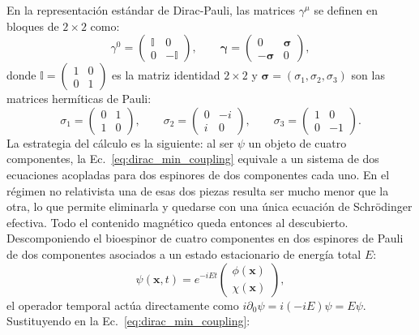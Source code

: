 \documentclass[10pt,a4paper]{article}
\begin{document}
En la representación estándar de Dirac-Pauli, las matrices $\gamma^\mu$ se definen en bloques de $2 \times 2$ como:
\begin{equation}
\gamma^0 = \begin{pmatrix} \mathbb{I} & 0 \\ 0 & -\mathbb{I} \end{pmatrix}, \qquad \boldsymbol{\gamma} = \begin{pmatrix} 0 & \boldsymbol{\sigma} \\ -\boldsymbol{\sigma} & 0 \end{pmatrix},
\end{equation}
donde $\mathbb{I} = \begin{pmatrix} 1 & 0 \\ 0 & 1 \end{pmatrix}$ es la matriz identidad $2\times 2$ y $\boldsymbol{\sigma} = (\sigma_1, \sigma_2, \sigma_3)$ son las matrices hermíticas de Pauli:
\begin{equation}
\sigma_1 = \begin{pmatrix} 0 & 1 \\ 1 & 0 \end{pmatrix}, \qquad \sigma_2 = \begin{pmatrix} 0 & -i \\ i & 0 \end{pmatrix}, \qquad \sigma_3 = \begin{pmatrix} 1 & 0 \\ 0 & -1 \end{pmatrix}.
\end{equation}
La estrategia del cálculo es la siguiente: al ser $\psi$ un objeto de cuatro componentes, la Ec.~\eqref{eq:dirac_min_coupling} equivale a un sistema de dos ecuaciones acopladas para dos espinores de dos componentes cada uno. En el régimen no relativista una de esas dos piezas resulta ser mucho menor que la otra, lo que permite eliminarla y quedarse con una única ecuación de Schrödinger efectiva. Todo el contenido magnético queda entonces al descubierto. Descomponiendo el bioespinor de cuatro componentes en dos espinores de Pauli de dos componentes asociados a un estado estacionario de energía total $E$:
\begin{equation}
\psi(\mathbf{x}, t) = e^{-i E t} \begin{pmatrix} \phi(\mathbf{x}) \\ \chi(\mathbf{x}) \end{pmatrix},
\end{equation}
el operador temporal actúa directamente como $i\partial_0 \psi = i(-iE)\psi = E\psi$. Sustituyendo en la Ec.~\eqref{eq:dirac_min_coupling}:
\end{document}
